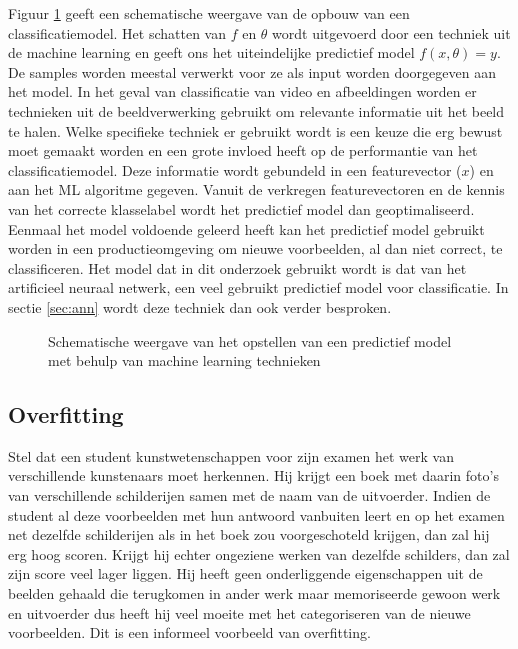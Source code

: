 \npar Figuur \ref{fig:alg-class-model} geeft een schematische weergave van de opbouw van een classificatiemodel. Het schatten van $f$ en $\theta$ wordt uitgevoerd door een techniek uit de machine learning en geeft ons het uiteindelijke predictief model $f(x,\theta) = y$. De samples worden meestal verwerkt voor ze als input worden doorgegeven aan het model. In het geval van classificatie van video en afbeeldingen worden er technieken uit de beeldverwerking gebruikt om relevante informatie uit het beeld te halen. Welke specifieke techniek er gebruikt wordt is een keuze die erg bewust moet gemaakt worden en een grote invloed heeft op de performantie van het classificatiemodel. Deze informatie wordt gebundeld in een featurevector ($x$) en aan het ML algoritme gegeven. Vanuit de verkregen featurevectoren en de kennis van het correcte klasselabel wordt het predictief model dan geoptimaliseerd.
\npar Eenmaal het model voldoende geleerd heeft kan het predictief model gebruikt worden in een productieomgeving om nieuwe voorbeelden, al dan niet correct, te classificeren.
\npar Het model dat in dit onderzoek gebruikt wordt is dat van het artificieel neuraal netwerk, een veel gebruikt predictief model voor classificatie. In sectie \ref{sec:ann} wordt deze techniek dan ook verder besproken.
\begin{figure}[t]
	\centering
	\def\svgscale{0.85}
	
	\caption{Schematische weergave van het opstellen van een predictief model met behulp van machine learning technieken \label{fig:alg-class-model}}
\end{figure}

\subsection{Overfitting}
Stel dat een student kunstwetenschappen voor zijn examen het werk van verschillende kunstenaars moet herkennen. Hij krijgt een boek met daarin foto's van verschillende schilderijen samen met de naam van de uitvoerder. Indien de student al deze voorbeelden met hun antwoord vanbuiten leert en op het examen net dezelfde schilderijen als in het boek zou voorgeschoteld krijgen, dan zal hij erg hoog scoren. Krijgt hij echter ongeziene werken van dezelfde schilders, dan zal zijn score veel lager liggen. Hij heeft geen onderliggende eigenschappen uit de beelden gehaald die terugkomen in ander werk maar memoriseerde gewoon werk en uitvoerder dus heeft hij veel moeite met het categoriseren van de nieuwe voorbeelden. Dit is een informeel voorbeeld van overfitting.

